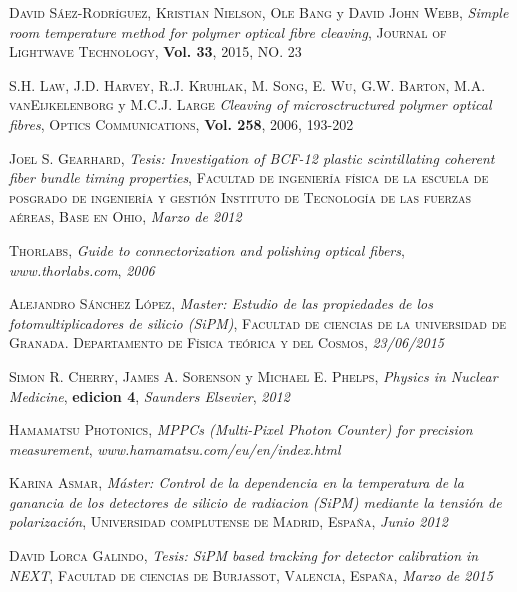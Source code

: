 \begin{thebibliography}{99}
 \textsc{David Sáez-Rodríguez}, \textsc{Kristian Nielson}, \textsc{Ole Bang} y \textsc{David John Webb},
\textit{Simple room temperature method for polymer optical fibre cleaving}, \textsc{Journal of Lightwave Technology}, \textbf{Vol. 33}, \textsc{2015}, \textsc{NO. 23}

 \textsc{S.H. Law}, \textsc{J.D. Harvey}, \textsc{R.J. Kruhlak}, \textsc{M. Song}, \textsc{E. Wu}, \textsc{G.W. Barton}, \textsc{M.A. vanEijkelenborg} y \textsc{M.C.J. Large}
\textit{Cleaving of microsctructured polymer optical fibres}, \textsc{Optics Communications}, \textbf{Vol. 258}, \textsc{2006}, \textsc{193-202}

 \textsc{Joel S. Gearhard},
\textit{Tesis: Investigation of BCF-12 plastic scintillating coherent fiber bundle timing properties}, \textsc{Facultad de ingeniería física de la escuela de posgrado de ingeniería y gestión} \textsc{Instituto de Tecnología de las fuerzas aéreas, Base en Ohio}, \textit{Marzo de 2012}

 \textsc{Thorlabs},
\textit{Guide to connectorization and polishing optical fibers}, \textit{www.thorlabs.com}, \textit{2006}

 \textsc{Alejandro Sánchez López},
\textit{Master: Estudio de las propiedades de los fotomultiplicadores de silicio (SiPM)}, \textsc{Facultad de ciencias de la universidad de Granada. Departamento de Física teórica y del Cosmos}, \textit{23/06/2015}

 \textsc{Simon R. Cherry}, \textsc{James A. Sorenson} y \textsc{Michael E. Phelps},
\textit{Physics in Nuclear Medicine}, \textbf{edicion 4}, \textit{Saunders Elsevier}, \textit{2012}

 \textsc{Hamamatsu Photonics},
\textit{MPPCs (Multi-Pixel Photon Counter) for precision measurement}, \textit{www.hamamatsu.com/eu/en/index.html}

 \textsc{Karina Asmar},
\textit{Máster: Control de la dependencia en la temperatura de la ganancia de los detectores de silicio de radiacion (SiPM) mediante la tensión de polarización}, \textsc{Universidad complutense de Madrid, España}, \textit{Junio 2012}

 \textsc{David Lorca Galindo},
\textit{Tesis: SiPM based tracking for detector calibration in NEXT}, \textsc{Facultad de ciencias de Burjassot, Valencia, España}, \textit{Marzo de 2015}


\end{thebibliography}
